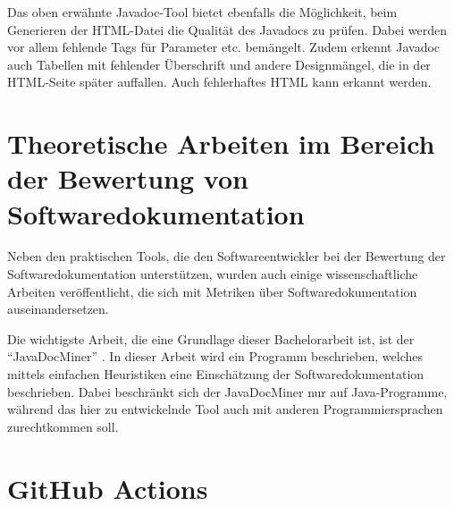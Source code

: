Das oben erwähnte Javadoc-Tool bietet ebenfalls die Möglichkeit, beim Generieren der HTML-Datei die Qualität des Javadocs zu prüfen. Dabei werden vor allem fehlende Tags für Parameter etc. bemängelt. Zudem erkennt Javadoc auch Tabellen mit fehlender Überschrift und andere Designmängel, die in der HTML-Seite später auffallen. Auch fehlerhaftes HTML kann erkannt werden.

\section{Theoretische Arbeiten im Bereich der Bewertung von Softwaredokumentation}

Neben den praktischen Tools, die den Softwareentwickler bei der Bewertung der Softwaredokumentation unterstützen, wurden auch einige wissenschaftliche Arbeiten veröffentlicht, die sich mit Metriken über Softwaredokumentation auseinandersetzen. 

Die wichtigste Arbeit, die eine Grundlage dieser Bachelorarbeit ist, ist der \enquote{JavaDocMiner} \cite[S. 68-79]{AutomaticQualityAssessmentofSourceCodeComments:TheJavadocMiner}. In dieser Arbeit wird ein Programm beschrieben, welches mittels einfachen Heuristiken eine Einschätzung der Softwaredokumentation beschrieben. Dabei beschränkt sich der JavaDocMiner nur auf Java-Programme, während das hier zu entwickelnde Tool  auch mit anderen Programmiersprachen zurechtkommen soll. 
\section{GitHub Actions}
